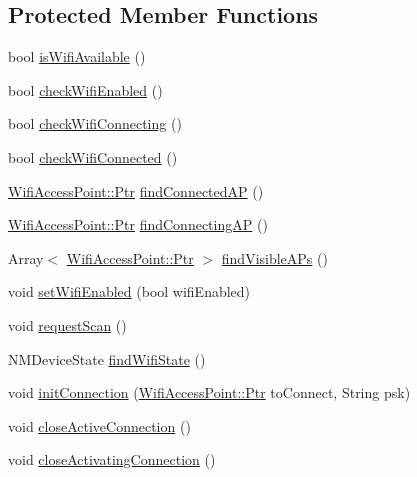 \subsection*{Protected Member Functions}
\begin{DoxyCompactItemize}
\item 
bool \mbox{\hyperlink{classLibNMHandler_a2b022c92983f1e4791008082e8d4cf65}{is\+Wifi\+Available}} ()
\item 
bool \mbox{\hyperlink{classLibNMHandler_a469573619b34a6882623311ecd484299}{check\+Wifi\+Enabled}} ()
\item 
bool \mbox{\hyperlink{classLibNMHandler_afa324173fea0cba03e9558adb308187a}{check\+Wifi\+Connecting}} ()
\item 
bool \mbox{\hyperlink{classLibNMHandler_a08bf31efbab3b2abbf7ddfa719a525bc}{check\+Wifi\+Connected}} ()
\item 
\mbox{\hyperlink{classWifiAccessPoint_ad18977f884076774803027efbaa131a0}{Wifi\+Access\+Point\+::\+Ptr}} \mbox{\hyperlink{classLibNMHandler_a71be7a3eea22000316d68233f900ec13}{find\+Connected\+AP}} ()
\item 
\mbox{\hyperlink{classWifiAccessPoint_ad18977f884076774803027efbaa131a0}{Wifi\+Access\+Point\+::\+Ptr}} \mbox{\hyperlink{classLibNMHandler_af38c5d5d511e2ac19c8a21becb171fcf}{find\+Connecting\+AP}} ()
\item 
Array$<$ \mbox{\hyperlink{classWifiAccessPoint_ad18977f884076774803027efbaa131a0}{Wifi\+Access\+Point\+::\+Ptr}} $>$ \mbox{\hyperlink{classLibNMHandler_add13adb1e34a1159f31c3c1502bd48a2}{find\+Visible\+A\+Ps}} ()
\item 
void \mbox{\hyperlink{classLibNMHandler_a3093d44da5d8f120474ff176d1416d07}{set\+Wifi\+Enabled}} (bool wifi\+Enabled)
\item 
void \mbox{\hyperlink{classLibNMHandler_aa88624884963c3677b83a126898726b9}{request\+Scan}} ()
\item 
N\+M\+Device\+State \mbox{\hyperlink{classLibNMHandler_a65d0b0c93474dd2b1d0f2af651640a8e}{find\+Wifi\+State}} ()
\item 
void \mbox{\hyperlink{classLibNMHandler_a3862693690fb2a2f6003bb82dec4d79c}{init\+Connection}} (\mbox{\hyperlink{classWifiAccessPoint_ad18977f884076774803027efbaa131a0}{Wifi\+Access\+Point\+::\+Ptr}} to\+Connect, String psk)
\item 
void \mbox{\hyperlink{classLibNMHandler_aabadb14cb6628ff27bfa6d26960cde27}{close\+Active\+Connection}} ()
\item 
void \mbox{\hyperlink{classLibNMHandler_a7aae3af6ef86da365f629faf37234f98}{close\+Activating\+Connection}} ()

\end{DoxyCompactItemize}
